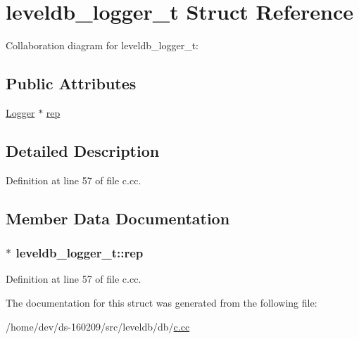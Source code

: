 \hypertarget{structleveldb__logger__t}{}\section{leveldb\+\_\+logger\+\_\+t Struct Reference}
\label{structleveldb__logger__t}


Collaboration diagram for leveldb\+\_\+logger\+\_\+t\+:
\subsection*{Public Attributes}
\begin{DoxyCompactItemize}
\item 
\hyperlink{classleveldb_1_1_logger}{Logger} $\ast$ \hyperlink{structleveldb__logger__t_aa27dd9e07077dbde7b776c8f548c749b}{rep}
\end{DoxyCompactItemize}


\subsection{Detailed Description}


Definition at line 57 of file c.\+cc.



\subsection{Member Data Documentation}
\hypertarget{structleveldb__logger__t_aa27dd9e07077dbde7b776c8f548c749b}{}
\subsubsection[{rep}]{$\ast$ leveldb\+\_\+logger\+\_\+t\+::rep}\label{structleveldb__logger__t_aa27dd9e07077dbde7b776c8f548c749b}


Definition at line 57 of file c.\+cc.



The documentation for this struct was generated from the following file\+:\begin{DoxyCompactItemize}
\item 
/home/dev/ds-\/160209/src/leveldb/db/\hyperlink{c_8cc}{c.\+cc}\end{DoxyCompactItemize}
